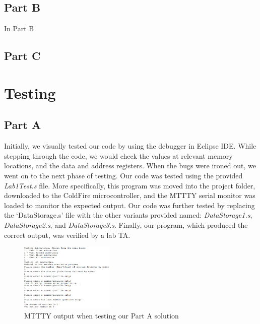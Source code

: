 \documentclass[letterpaper]{article}
\begin{document}
  \subsection{Part B}
    In Part B



    \subsection{Part C}

\section{Testing}
  \subsection{Part A}
    Initially, we visually tested our code by using the debugger in Eclipse IDE.
    While stepping through the code, we would check the values at relevant memory
    locations, and the data and address registers. When the bugs were ironed out,
    we went on to the next phase of testing.
    Our code was tested using the provided \textit{Lab1Test.s} file. More specifically,
    this program was moved into the project folder, downloaded to the ColdFire microcontroller,
    and the MTTTY serial monitor was loaded to monitor the expected output. Our code was
    further tested by replacing the `DataStorage.s' file with the other variants provided
    named: \textit{DataStorage1.s}, \textit{DataStorage2.s}, and \textit{DataStorage3.s}.
    Finally, our program, which produced the correct output, was verified by a lab TA.

    \begin{figure}[H]
      \centering
      \includegraphics[width=0.4\textwidth]{parta.jpg}
      \caption{MTTTY output when testing our Part A solution}
    \end{figure}
\end{document}
